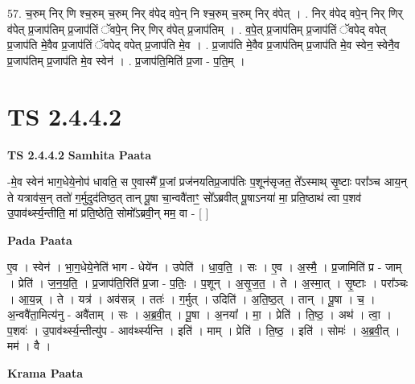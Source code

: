\documentclass[17pt]{extarticle}
\begin{document}
57. च॒रुम् निर् णि श्च॒रुम् च॒रुम् निर् व॑पेद् वपे॒न् नि श्च॒रुम् च॒रुम् निर् व॑पेत् । . निर् व॑पेद् वपे॒न् निर् णिर् व॑पेत् प्र॒जाप॑तिम् प्र॒जाप॑तिं ॅवपे॒न् निर् णिर् व॑पेत् प्र॒जाप॑तिम् । . व॒पे॒त् प्र॒जाप॑तिम् प्र॒जाप॑तिं ॅवपेद् वपेत् प्र॒जाप॑ति मे॒वैव प्र॒जाप॑तिं ॅवपेद् वपेत् प्र॒जाप॑ति मे॒व । . प्र॒जाप॑ति मे॒वैव प्र॒जाप॑तिम् प्र॒जाप॑ति मे॒व स्वेन॒ स्वेनै॒व प्र॒जाप॑तिम् प्र॒जाप॑ति मे॒व स्वेन॑ । . प्र॒जाप॑ति॒मिति॑ प्र॒जा - प॒ति॒म् । \newline
\pagebreak
{}
\section*{ TS 2.4.4.2 }

\textbf{TS 2.4.4.2 } \newline
\textbf{Samhita Paata} \newline

-मे॒व स्वेन॑ भाग॒धेये॒नोप॑ धावति॒ स ए॒वास्मै᳚ प्र॒जां प्रज॑नयतिप्र॒जाप॑तिः प॒शून॑सृजत॒ ते᳚ऽस्माथ् सृ॒ष्टाः परा᳚ञ्च आय॒न् ते यत्राव॑स॒न् ततो॑ ग॒र्मुदुद॑तिष्ठ॒त् तान् पू॒षा चा॒न्ववै॑ताꣳ॒॒ सो᳚ऽब्रवीत् पू॒षाऽनया॑ मा॒ प्रति॒ष्ठाथ॑ त्वा प॒शव॑ उ॒पाव॑र्थ्स्य॒न्तीति॒ मां प्रति॒ष्ठेति॒ सोमो᳚ऽब्रवी॒न् मम॒ वा - [  ] \newline

\textbf{Pada Paata} \newline

ए॒व । स्वेन॑ । भा॒ग॒धेये॒नेति॑ भाग - धेये॑न । उपेति॑ । धा॒व॒ति॒ । सः । ए॒व । अ॒स्मै॒ । प्र॒जामिति॑ प्र - जाम् । प्रेति॑ । ज॒न॒य॒ति॒ । प्र॒जाप॑ति॒रिति॑ प्र॒जा - प॒तिः॒ । प॒शून् । अ॒सृ॒ज॒त॒ । ते । अ॒स्मा॒त् । सृ॒ष्टाः । परा᳚ञ्चः । आ॒य॒न्न् । ते । यत्र॑ । अव॑सन्न् । ततः॑ । ग॒र्मुत् । उदिति॑ । अ॒ति॒ष्ठ॒त् । तान् । पू॒षा । च॒ । अ॒न्ववै॑ता॒मित्य॑नु - अवै॑ताम् । सः । अ॒ब्र॒वी॒त् । पू॒षा । अ॒नया᳚ । मा॒ । प्रेति॑ । ति॒ष्ठ॒ । अथ॑ । त्वा॒ । प॒शवः॑ । उ॒पाव॑र्थ्स्य॒न्तीत्यु॑प - आव॑र्थ्स्यन्ति । इति॑ । माम् । प्रेति॑ । ति॒ष्ठ॒ । इति॑ । सोमः॑ । अ॒ब्र॒वी॒त् । मम॑ । वै ।  \newline


\textbf{Krama Paata} \newline
\end{document}
